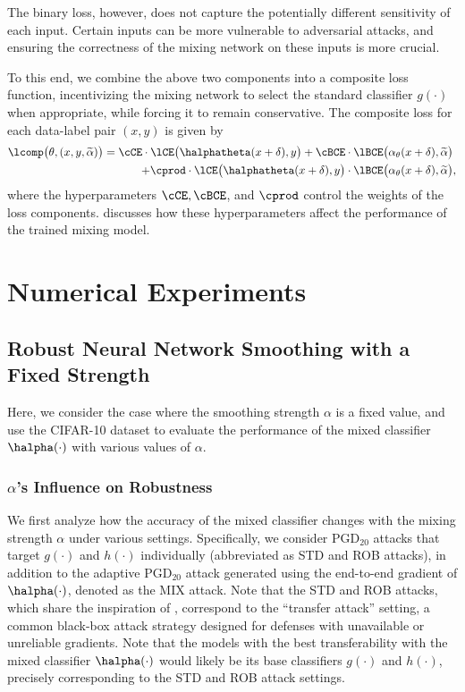 \documentclass[11pt, letterpaper]{article}
\theoremstyle{plain}
\theoremstyle{definition}
\begin{document}
The binary loss, however, does not capture the potentially different sensitivity of each input. Certain inputs can be more vulnerable to adversarial attacks, and ensuring the correctness of the mixing network on these inputs is more crucial.

To this end, we combine the above two components into a composite loss function, incentivizing the mixing network to select the standard classifier $g (\cdot)$ when appropriate, while forcing it to remain conservative. The composite loss for each data-label pair $(x, y)$ is given by
\begin{align} \label{eq:comp_loss}
    \lcomp \big( \theta, ( x, y, \widetilde{\alpha} ) \big) = 
    \cCE \cdot \lCE \big( \halphatheta (x+\delta), y \big) + \cBCE \cdot \lBCE & \big( \alpha_\theta (x+\delta), \widetilde{\alpha} \big) \\
    \qquad + \cprod \cdot \lCE \big( \halphatheta (x+\delta), y \big) \cdot \lBCE & \big( \alpha_\theta (x+\delta), \widetilde{\alpha} \big), \nonumber
\end{align}
where the hyperparameters $\cCE, \cBCE$, and $\cprod$ control the weights of the loss components.  discusses how these hyperparameters affect the performance of the trained mixing model.



\section{Numerical Experiments} \label{sec:experiments}

\subsection{Robust Neural Network Smoothing with a Fixed Strength} \label{sec:exp_CNN_fix}

Here, we consider the case where the smoothing strength $\alpha$ is a fixed value, and use the CIFAR-10 dataset to evaluate the performance of the mixed classifier $\halpha (\cdot)$ with various values of $\alpha$.

\subsubsection{$\alpha$'s Influence on Robustness} \label{sec:alpha_analysis}

We first analyze how the accuracy of the mixed classifier changes with the mixing strength $\alpha$ under various settings. Specifically, we consider PGD$_{20}$ attacks that target $g (\cdot)$ and $h (\cdot)$ individually (abbreviated as STD and ROB attacks), in addition to the adaptive PGD$_{20}$ attack generated using the end-to-end gradient of $\halpha (\cdot)$, denoted as the MIX attack. Note that the STD and ROB attacks, which share the inspiration of \citep{Gao22}, correspond to the ``transfer attack'' setting, a common black-box attack strategy designed for defenses with unavailable or unreliable gradients. Note that the models with the best transferability with the mixed classifier $\halpha (\cdot)$ would likely be its base classifiers $g (\cdot)$ and $h (\cdot)$, precisely corresponding to the STD and ROB attack settings.
\end{document}
